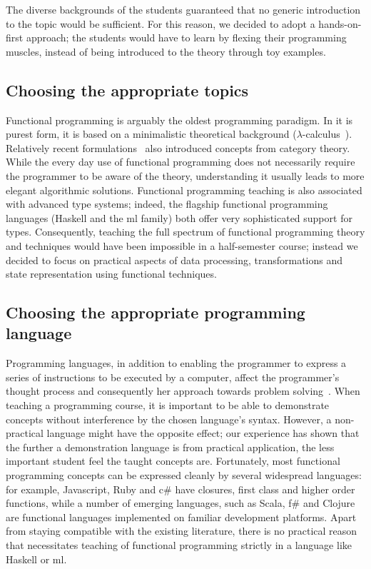\documentclass[conference]{IEEEtran}
\begin{document}
The diverse backgrounds of the students guaranteed that no generic
introduction to the topic would be sufficient. For this reason, we decided
to adopt a hands-on-first approach; the students would have to learn by
flexing their programming muscles, instead of being introduced to 
the theory through toy examples.

\subsection{Choosing the appropriate topics}

Functional programming is arguably the oldest programming paradigm. In it is
purest form, it is based on a minimalistic theoretical background
($\lambda$-calculus~\cite{Baren84}). Relatively recent
formulations~\cite{Meije91, Wadle93} also introduced concepts from category
theory. While the every day use of functional programming does not necessarily
require the programmer to be aware of the theory, understanding it usually leads
to more elegant algorithmic solutions. Functional programming teaching is also
associated with advanced type systems; indeed, the flagship functional
programming languages (Haskell and the {\sc ml} family) both offer very
sophisticated support for types. Consequently, teaching the full spectrum of
functional programming theory and techniques would have been impossible in a
half-semester course; instead we decided to focus on practical aspects of data
processing, transformations and state representation using functional
techniques.

\subsection{Choosing the appropriate programming language}

Programming languages, in addition to enabling the programmer to express a
series of instructions to be executed by a computer, affect the programmer's
thought process and consequently her approach towards problem
solving~\cite{Ivers80}.  When teaching a programming course, it is important to
be able to demonstrate concepts without interference by the chosen language's
syntax. However, a non-practical language might have the opposite effect; our
experience has shown that the further a demonstration language is from practical
application, the less important student feel the taught concepts are.
Fortunately, most functional programming concepts can be expressed cleanly by
several widespread languages: for example, Javascript, Ruby and {\sc c\#} have
closures, first class and higher order functions, while a number of emerging
languages, such as Scala, {\sc f\#} and Clojure are functional languages
implemented on familiar development platforms. Apart from staying compatible
with the existing literature, there is no practical reason that necessitates
teaching of functional programming strictly in a language like Haskell or {\sc
ml}.
\end{document}
